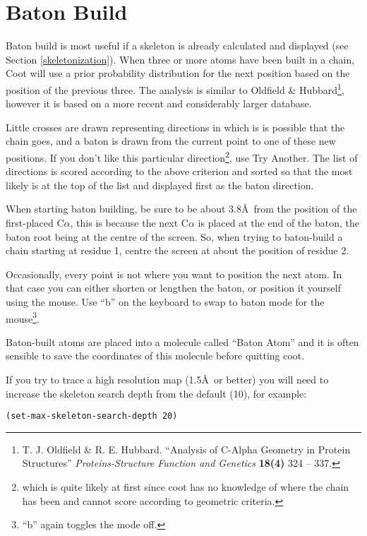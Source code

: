 \documentclass{book}
\begin{document}
\section{Baton Build}
 Baton build is most useful if a skeleton is
already calculated and displayed (see Section \ref{skeletonization}).
When three or more atoms have been built in a chain, Coot will use a
prior probability distribution for the next position based on the
position of the previous three.  The analysis is similar to Oldfield
\& Hubbard\footnote{T. J.  Oldfield \& R. E. Hubbard.  ``Analysis of
  C-Alpha Geometry in Protein Structures'' \emph{Proteins-Structure
    Function and Genetics} \textbf{18(4)} 324 -- 337.}, however it is
based on a more recent and considerably larger database.

Little crosses are drawn representing directions in which is is
possible that the chain goes, and a baton is drawn from the current
point to one of these new positions.  If you don't like this
particular direction\footnote{which is quite likely at first since
  coot has no knowledge of where the chain has been and cannot score
  according to geometric criteria.}, use \textsf{Try Another}.  The
list of directions is scored according to the above criterion and
sorted so that the most likely is at the top of the list and displayed
first as the baton direction.

When starting baton building, be sure to be about 3.8\AA\ from the
position of the first-placed C$\alpha$, this is because the next
C$\alpha$ is placed at the end of the baton, the baton root being at
the centre of the screen.  So, when trying to baton-build a chain
starting at residue 1, centre the screen at about the position of
residue 2.

Occasionally, every point is not where you want to
position the next atom.  In that case you can either shorten or
lengthen the baton, or position it yourself using the mouse.  Use
``b'' on the keyboard to swap to baton mode for the
mouse\footnote{``b'' again toggles the mode off.}.

Baton-built atoms are placed into a molecule called ``Baton Atom'' and
it is often sensible to save the coordinates of this molecule before
quitting coot.

If you try to trace a high resolution map (1.5\AA\  or better) you will
need to increase the skeleton search depth from the default (10), for
example:

\texttt{(set-max-skeleton-search-depth 20)}
\end{document}
